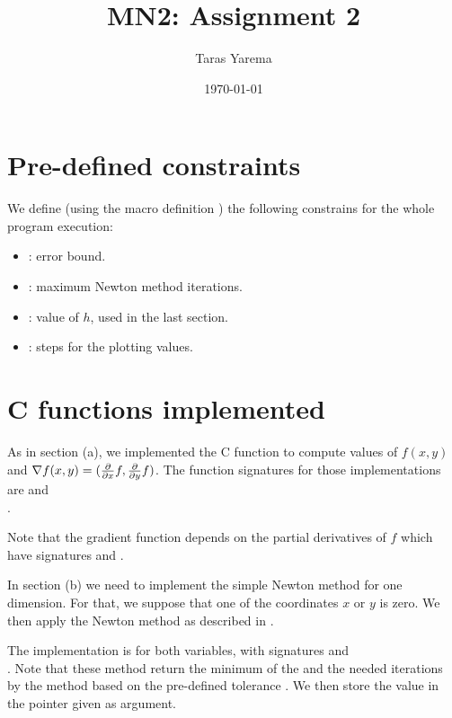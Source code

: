 \documentclass[11pt]{article}
\title{MN2: Assignment 2}
\author{Taras Yarema}
\date{\today}
\begin{document}
\maketitle

\section{Pre-defined constraints}

We define (using the macro definition ) the following constrains for the whole program execution:

\begin{itemize}
    \item {}: error bound.
    \item {}: maximum Newton method iterations.
    \item {}: value of $h$, used in the last section.
    \item {}: steps for the plotting values.
\end{itemize}


\section{C functions implemented}

As in section (a), we implemented the C function to compute values of $f(x, y)$ 
and $\nabla f(x, y) = (\df{x}, \df{y})$.
The function signatures for those implementations are 
 and \\
.

Note that the gradient function depends on the partial derivatives of $f$ which have signatures
 and
.

In section (b) we need to implement the simple Newton method for one dimension.
For that, we suppose that one of the coordinates $x$ or $y$ is zero.
We then apply the Newton method as described in \cite[Note 3.2.1 (a)]{MN2:1}.

The implementation is for both variables, with signatures
 and \\
.
Note that these method return the minimum of the  and the needed iterations by the
method based on the pre-defined tolerance . 
We then store the value in the pointer given as argument.
\end{document}
